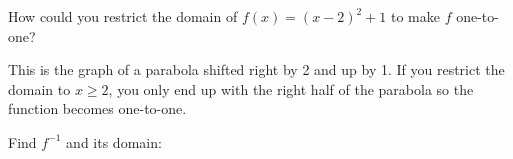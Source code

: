 \documentclass[fleqn,addpoints]{exam}
\begin{document}
\begin{questions}

  \pagebreak

  \question[5]
    How could you restrict the domain of $f(x) = (x - 2)^2 + 1$ to make $f$ one-to-one?
    \begin{solution}[4 cm]
      This is the graph of a parabola shifted right by 2 and up by 1.  If you restrict the domain to $x \geq 2$, you
      only end up with the right half of the parabola so the function becomes one-to-one.
    \end{solution}

  \question
    Find $f^{-1}$ and its domain:
\end{questions}
\end{document}
